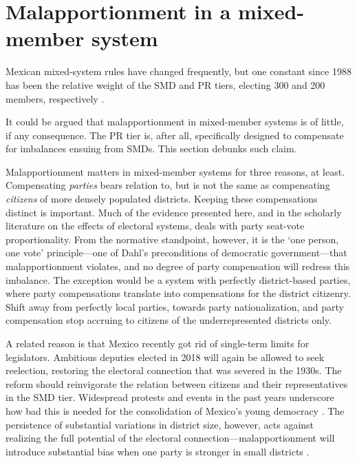 \documentclass[letter,12pt]{article}
\begin{document}

\section{Malapportionment in a mixed-member system}

Mexican mixed-system rules have changed frequently, but one constant since 1988 has been the relative weight of the SMD and PR tiers, electing 300 and 200 members, respectively \citep{lujambio.vives.2008}. 

It could be argued that malapportionment in mixed-member systems is of little, if any consequence. The PR tier is, after all, specifically designed to compensate for imbalances ensuing from SMDs. This section debunks such claim. 

Malapportionment matters in mixed-member systems for three reasons, at least. Compensating \emph{parties} bears relation to, but is not the same as compensating \emph{citizens} of more densely populated districts. Keeping these compensations distinct is important. Much of the evidence presented here, and in the scholarly literature on the effects of electoral systems, deals with party seat-vote proportionality. From the normative standpoint, however, it is the `one person, one vote' principle---one of Dahl's \citeyearpar{dahl.1972} preconditions of democratic government---that malapportionment violates, and no degree of party compensation will redress this imbalance. The exception would be a system with perfectly district-based parties, where party compensations translate into compensations for the district citizenry. Shift away from perfectly local parties, towards party nationalization, and party compensation stop accruing to citizens of the underrepresented districts only. 

A related reason is that Mexico recently got rid of single-term limits for legislators. Ambitious deputies elected in 2018 will again be allowed to seek reelection, restoring the electoral connection  \citep{mayhew.1974} that was severed in the 1930s. The reform should reinvigorate the relation between citizens and their representatives in the SMD tier. Widespread protests and events in the past years underscore how bad this is needed for the consolidation of Mexico's young democracy \citep{dworak.legisladorAexamen.2003}. The persistence of substantial variations in district size, however, acts against realizing the full potential of the electoral connection---malapportionment will introduce substantial bias when one party is stronger in small districts \citep[as Tories were in Great Britain up to 1997,][]{johnston.2002}.
\end{document}
